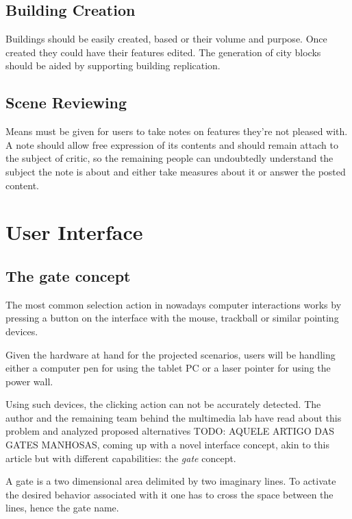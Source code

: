 \subsection{Building Creation}

Buildings should be easily created, based or their volume and purpose.
Once created they could have their features edited.
The generation of city blocks should be aided by supporting building replication.


\subsection{Scene Reviewing}

Means must be given for users to take notes on features they're not pleased with.
A note should allow free expression of its contents and should remain attach to the
subject of critic, so the remaining people can undoubtedly understand the subject
the note is about and either take measures about it or answer the posted content.




\section{User Interface}

\subsection{The gate concept}

The most common selection action in nowadays computer interactions works by
pressing a button on the interface with the mouse, trackball or similar pointing devices.

Given the hardware at hand for the projected scenarios,
users will be handling either a computer pen for using the tablet PC or a laser pointer for using the power wall.

Using such devices, the clicking action can not be accurately detected.
The author and the remaining team behind the multimedia lab have read about this problem and analyzed proposed alternatives {TODO: AQUELE ARTIGO DAS GATES MANHOSAS},
coming up with a novel interface concept, akin to this article but with different capabilities: the \emph{gate} concept.

A gate is a two dimensional area delimited by two imaginary lines. To activate the desired behavior associated
with it one has to cross the space between the lines, hence the gate name.

